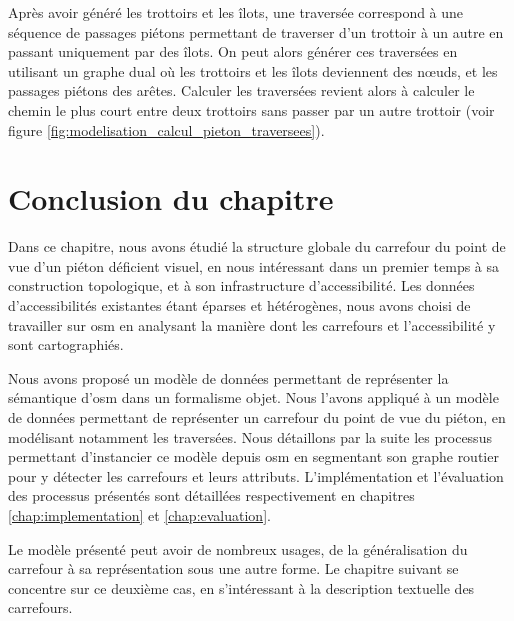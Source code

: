 Après avoir généré les trottoirs et les îlots, une traversée correspond à une séquence de passages piétons permettant de traverser d'un trottoir à un autre en passant uniquement par des îlots. On peut alors générer ces traversées en utilisant un graphe dual où les trottoirs et les îlots deviennent des nœuds, et les passages piétons des arêtes. Calculer les traversées revient alors à calculer le chemin le plus court entre deux trottoirs sans passer par un autre trottoir (voir figure \ref{fig:modelisation_calcul_pieton_traversees}).

\section{Conclusion du chapitre}

Dans ce chapitre, nous avons étudié la structure globale du carrefour du point de vue d'un piéton déficient visuel, en nous intéressant dans un premier temps à sa construction topologique, et à son infrastructure d'accessibilité. Les données d'accessibilités existantes étant éparses et hétérogènes, nous avons choisi de travailler sur \gls{osm} en analysant la manière dont les carrefours et l'accessibilité y sont cartographiés.

\newpar{}

Nous avons proposé un modèle de données permettant de représenter la sémantique d'\gls{osm} dans un formalisme objet. Nous l'avons appliqué à un modèle de données permettant de représenter un carrefour du point de vue du piéton, en modélisant notamment les traversées. Nous détaillons par la suite les processus permettant d'instancier ce modèle depuis \gls{osm} en segmentant son graphe routier pour y détecter les carrefours et leurs attributs. L'implémentation et l'évaluation des processus présentés sont détaillées respectivement en chapitres \ref{chap:implementation} et \ref{chap:evaluation}.

\newpar{}

Le modèle présenté peut avoir de nombreux usages, de la généralisation du carrefour à sa représentation sous une autre forme. Le chapitre suivant se concentre sur ce deuxième cas, en s'intéressant à la description textuelle des carrefours.